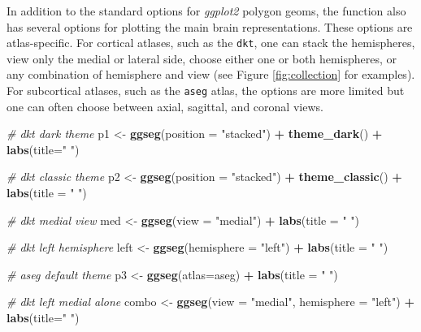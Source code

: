 \documentclass[fleqn,10pt]{wlpeerj} %
\newenvironment{Shaded}{\begin{snugshade}}{\end{snugshade}}
\newcommand{\CommentTok}[1]{\textcolor[rgb]{0.56,0.35,0.01}{\textit{#1}}}
\newcommand{\DataTypeTok}[1]{\textcolor[rgb]{0.13,0.29,0.53}{#1}}
\newcommand{\KeywordTok}[1]{\textcolor[rgb]{0.13,0.29,0.53}{\textbf{#1}}}
\newcommand{\NormalTok}[1]{#1}
\newcommand{\OperatorTok}[1]{\textcolor[rgb]{0.81,0.36,0.00}{\textbf{#1}}}
\newcommand{\StringTok}[1]{\textcolor[rgb]{0.31,0.60,0.02}{#1}}
\begin{document}
In addition to the standard options for \emph{ggplot2} polygon geoms, the function also has several options for plotting the main brain representations.
These options are atlas-specific.
For cortical atlases, such as the \texttt{dkt}, one can stack the hemispheres, view only the medial or lateral side, choose either one or both hemispheres, or any combination of hemisphere and view (see Figure \ref{fig:collection} for examples).
For subcortical atlases, such as the \texttt{aseg} atlas, the options are more limited but one can often choose between axial, sagittal, and coronal views.

\begin{Shaded}
\begin{Highlighting}[]
\CommentTok{\# dkt dark theme}
\NormalTok{p1 <{-}}\StringTok{ }\KeywordTok{ggseg}\NormalTok{(}\DataTypeTok{position =} \StringTok{"stacked"}\NormalTok{) }\OperatorTok{+}
\StringTok{  }\KeywordTok{theme\_dark}\NormalTok{() }\OperatorTok{+}
\StringTok{  }\KeywordTok{labs}\NormalTok{(}\DataTypeTok{title=}\StringTok{" "}\NormalTok{)}

\CommentTok{\# dkt classic theme}
\NormalTok{p2 <{-}}\StringTok{ }\KeywordTok{ggseg}\NormalTok{(}\DataTypeTok{position =} \StringTok{"stacked"}\NormalTok{) }\OperatorTok{+}
\StringTok{  }\KeywordTok{theme\_classic}\NormalTok{() }\OperatorTok{+}
\StringTok{  }\KeywordTok{labs}\NormalTok{(}\DataTypeTok{title =} \StringTok{" "}\NormalTok{)}

\CommentTok{\# dkt medial view}
\NormalTok{med <{-}}\StringTok{ }\KeywordTok{ggseg}\NormalTok{(}\DataTypeTok{view =} \StringTok{"medial"}\NormalTok{) }\OperatorTok{+}
\StringTok{  }\KeywordTok{labs}\NormalTok{(}\DataTypeTok{title =} \StringTok{" "}\NormalTok{)}

\CommentTok{\# dkt left hemisphere}
\NormalTok{left <{-}}\StringTok{ }\KeywordTok{ggseg}\NormalTok{(}\DataTypeTok{hemisphere =} \StringTok{"left"}\NormalTok{) }\OperatorTok{+}
\StringTok{  }\KeywordTok{labs}\NormalTok{(}\DataTypeTok{title =} \StringTok{" "}\NormalTok{)}

\CommentTok{\# aseg default theme}
\NormalTok{p3 <{-}}\StringTok{ }\KeywordTok{ggseg}\NormalTok{(}\DataTypeTok{atlas=}\NormalTok{aseg) }\OperatorTok{+}
\StringTok{  }\KeywordTok{labs}\NormalTok{(}\DataTypeTok{title =} \StringTok{" "}\NormalTok{)}

\CommentTok{\# dkt left medial alone}
\NormalTok{combo <{-}}\StringTok{ }\KeywordTok{ggseg}\NormalTok{(}\DataTypeTok{view =} \StringTok{"medial"}\NormalTok{,}
               \DataTypeTok{hemisphere =} \StringTok{"left"}\NormalTok{) }\OperatorTok{+}
\StringTok{  }\KeywordTok{labs}\NormalTok{(}\DataTypeTok{title=}\StringTok{" "}\NormalTok{)}


\end{Highlighting}
\end{Shaded}
\end{document}
